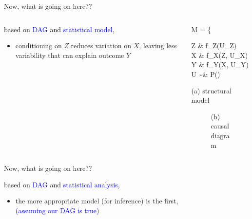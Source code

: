 \begin{frame}
	{Now, what is going on here??}
	\begin{columns}
		\begin{column}{0.5\textwidth}
			based on \textcolor{blue}{DAG} and \textcolor{blue}{statistical model},
			\begin{itemize}
				\item conditioning on $Z$ reduces variation on $X$, leaving less variability that can explain outcome $Y$
			\end{itemize}
		\end{column}
		\begin{column}{0.5\textwidth}  
			\begin{equ}
				M = \left\{ \begin{aligned} 
					Z \leftarrow & \; f_{Z}(U_{Z}) \\
					X \leftarrow & \; f_{X}(Z, U_{X}) \\
					Y \leftarrow & \; f_{Y}(X, U_{Y}) \\
					U \sim & \; P()
				\end{aligned} \right
				\caption*{(a) structural model}
			\end{equ}
			\begin{figure}
				\caption*{(b) causal diagram}
			\end{figure}
		\end{column}
	\end{columns}
\end{frame}
%
%
\begin{lhframe}[rhgraphic={\texttt{[image: pipe1\_reg1.png]}}]
	{Now, what is going on here??}
	
	based on \textcolor{blue}{DAG} and \textcolor{blue}{statistical analysis},
	\begin{itemize}
		\item the more appropriate model (for inference) is the first, \\
		{\small \textcolor{blue}{(assuming our DAG is true)} }
	\end{itemize}
\end{lhframe}
%
%
